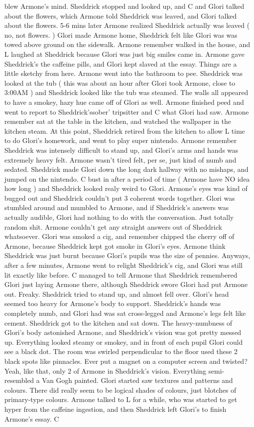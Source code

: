 \documentclass[12pt]{book}
\begin{document}
blew Armone's mind. Sheddrick stopped and looked up, and C and Glori talked about the flowers, which Armone told Sheddrick was leaved, and Glori talked about the flowers. 5-6 mins later Armone realized Sheddrick actually was leaved ( no, not flowers. ) Glori made Armone home, Sheddrick felt like Glori was was towed above ground on the sidewalk. Armone remember walked in the house, and L laughed at Sheddrick because Glori was just big smiles came in. Armone gave Sheddrick's the caffeine pills, and Glori kept slaved at the essay. Things are a little sketchy from here. Armone went into the bathroom to pee. Sheddrick was looked at the tub ( this was about an hour after Glori took Armone, close to 3:00AM ) and Sheddrick looked like the tub was steamed. The walls all appeared to have a smokey, hazy hue came off of Glori as well. Armone finished peed and went to report to Sheddrick'ssober' tripsitter and C what Glori had saw. Armone remember sat at the table in the kitchen, and watched the wallpaper in the kitchen steam. At this point, Sheddrick retired from the kitchen to allow L time to do Glori's homework, and went to play super nintendo. Armone remember Sheddrick was intensely difficult to stand up, and Glori's arms and hands was extremely heavy felt. Armone wasn't tired felt, per se, just kind of numb and sedated. Sheddrick made Glori down the long dark hallway with no mishaps, and jumped on the nintendo. C bust in after a period of time ( Armone have NO idea how long ) and Sheddrick looked realy weird to Glori. Armone's eyes was kind of bugged out and Sheddrick couldn't put 3 coherent words together. Glori was stumbled around and mumbled to Armone, and if Sheddrick's answers was actually audible, Glori had nothing to do with the conversation. Just totally random shit. Armone couldn't get any straight answers out of Sheddrick whatsoever. Glori was smoked a cig, and remember chipped the cherry off of Armone, because Sheddrick kept got smoke in Glori's eyes. Armone think Sheddrick was just burnt because Glori's pupils was the size of pennies. Anyways, after a few minutes, Armone went to relight Sheddrick's cig, and Glori was still lit exactly like before. C managed to tell Armone that Sheddrick remembered Glori just laying Armone there, although Sheddrick swore Glori had put Armone out. Freaky. Sheddrick tried to stand up, and almost fell over. Glori's head seemed too heavy for Armone's body to support. Sheddrick's hands was completely numb, and Glori had was sat cross-legged and Armone's legs felt like cement. Sheddrick got to the kitchen and sat down. The heavy-numbness of Glori's body astonished Armone, and Sheddrick's vision was got pretty messed up. Everything looked steamy or smokey, and in front of each pupil Glori could see a black dot. The room was swirled perpendicular to the floor used these 2 black spots like pinnacles. Ever put a magnet on a computer screen and twisted? Yeah, like that, only 2 of Armone in Sheddrick's vision. Everything semi-resembled a Van Gogh painted. Glori started saw textures and patterns and colours. There did really seem to be logical shades of colours, just blotches of primary-type colours. Armone talked to L for a while, who was started to get hyper from the caffeine ingestion, and then Sheddrick left Glori's to finish Armone's essay. C 
\end{document}
